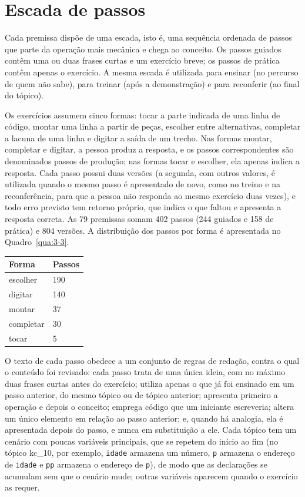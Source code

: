 \section{Escada de passos}

Cada premissa dispõe de uma escada, isto é, uma sequência ordenada de passos que parte da operação mais mecânica e chega ao conceito. Os passos guiados contêm uma ou duas frases curtas e um exercício breve; os passos de prática contêm apenas o exercício. A mesma escada é utilizada para ensinar (no percurso de quem não sabe), para treinar (após a demonstração) e para reconferir (ao final do tópico).

Os exercícios assumem cinco formas: tocar a parte indicada de uma linha de código, montar uma linha a partir de peças, escolher entre alternativas, completar a lacuna de uma linha e digitar a saída de um trecho. Nas formas montar, completar e digitar, a pessoa produz a resposta, e os passos correspondentes são denominados passos de produção; nas formas tocar e escolher, ela apenas indica a resposta. Cada passo possui duas versões (a segunda, com outros valores, é utilizada quando o mesmo passo é apresentado de novo, como no treino e na reconferência, para que a pessoa não responda ao mesmo exercício duas vezes), e todo erro previsto tem retorno próprio, que indica o que faltou e apresenta a resposta correta. As 79 premissas somam 402 passos (244 guiados e 158 de prática) e 804 versões. A distribuição dos passos por forma é apresentada no Quadro~\ref{qua:3-3}.

\begin{quadro}[htbp]
\caption{Passos por forma de exercício}\label{qua:3-3}
\footnotesize
\begin{tabularx}{\textwidth}{|X|l|}
\hline
\textbf{Forma} & \textbf{Passos} \\ \hline
escolher & 190 \\ \hline
digitar & 140 \\ \hline
montar & 37 \\ \hline
completar & 30 \\ \hline
tocar & 5 \\ \hline
\end{tabularx}
\end{quadro}

O texto de cada passo obedece a um conjunto de regras de redação, contra o qual o conteúdo foi revisado: cada passo trata de uma única ideia, com no máximo duas frases curtas antes do exercício; utiliza apenas o que já foi ensinado em um passo anterior, do mesmo tópico ou de tópico anterior; apresenta primeiro a operação e depois o conceito; emprega código que um iniciante escreveria; altera um único elemento em relação ao passo anterior; e, quando há analogia, ela é apresentada depois do passo, e nunca em substituição a ele. Cada tópico tem um cenário com poucas variáveis principais, que se repetem do início ao fim (no tópico kc\_10, por exemplo, \texttt{idade} armazena um número, \texttt{p} armazena o endereço de \texttt{idade} e \texttt{pp} armazena o endereço de \texttt{p}), de modo que as declarações se acumulam sem que o cenário mude; outras variáveis aparecem quando o exercício as requer.

